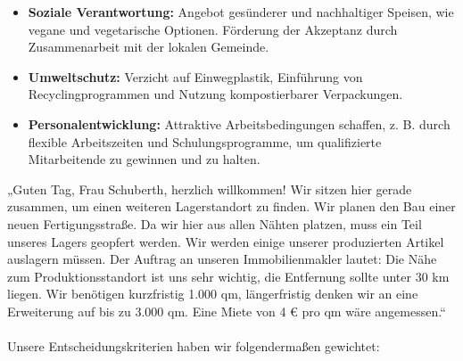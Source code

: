 {\begin{enumerate}[label=(\alph*)]
\begin{itemize}
        \item \textbf{Soziale Verantwortung:}
        Angebot gesünderer und nachhaltiger Speisen, wie vegane und vegetarische Optionen. Förderung der Akzeptanz durch Zusammenarbeit mit der lokalen Gemeinde.

        \item \textbf{Umweltschutz:}
        Verzicht auf Einwegplastik, Einführung von Recyclingprogrammen und Nutzung kompostierbarer Verpackungen.

        \item \textbf{Personalentwicklung:}
        Attraktive Arbeitsbedingungen schaffen, z. B. durch flexible Arbeitszeiten und Schulungsprogramme, um qualifizierte Mitarbeitende zu gewinnen und zu halten.
    \end{itemize}
\end{enumerate}
}

„Guten Tag, Frau Schuberth, herzlich willkommen! Wir sitzen hier gerade zusammen, um einen weiteren Lagerstandort zu finden. Wir planen den Bau einer neuen Fertigungsstraße. Da wir hier aus allen Nähten platzen, muss ein Teil unseres Lagers geopfert werden. Wir werden einige unserer produzierten Artikel auslagern müssen. Der Auftrag an unseren Immobilienmakler lautet: Die Nähe zum Produktionsstandort ist uns sehr wichtig, die Entfernung sollte unter 30 km liegen. Wir benötigen kurzfristig 1.000 qm, längerfristig denken wir an eine Erweiterung auf bis zu 3.000 qm. Eine Miete von 4 € pro qm wäre angemessen.“
\\~\\
Unsere Entscheidungskriterien haben wir folgendermaßen gewichtet:

